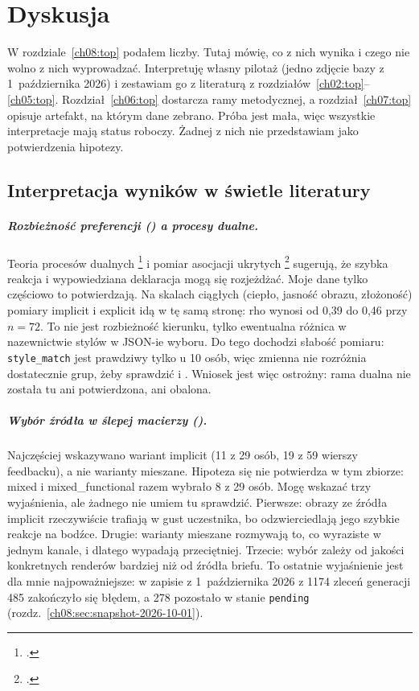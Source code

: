 \chapter{Dyskusja}
\label{ch09:top}

W rozdziale~\ref{ch08:top} podałem liczby. Tutaj mówię, co z nich wynika i czego nie wolno z nich wyprowadzać. Interpretuję własny pilotaż (jedno zdjęcie bazy z 1~października 2026) i zestawiam go z literaturą z rozdziałów~\ref{ch02:top}--\ref{ch05:top}. Rozdział~\ref{ch06:top} dostarcza ramy metodycznej, a rozdział~\ref{ch07:top} opisuje artefakt, na którym dane zebrano.
Próba jest mała, więc wszystkie interpretacje mają status roboczy. Żadnej z nich nie przedstawiam jako potwierdzenia hipotezy.

\section{Interpretacja wyników w świetle literatury}
\label{ch09:sec:interpretacja}

\paragraph{Rozbieżność preferencji () a procesy dualne.}
Teoria procesów dualnych \footcite{kahneman2011thinking} i pomiar asocjacji ukrytych \footcite{greenwald1998iat} sugerują, że szybka reakcja i wypowiedziana deklaracja mogą się rozjeżdżać. Moje dane tylko częściowo to potwierdzają.
Na skalach ciągłych (ciepło, jasność obrazu, złożoność) pomiary implicit i explicit idą w tę samą stronę: rho wynosi od 0,39 do 0,46 przy $n=72$. To nie jest rozbieżność kierunku, tylko ewentualna różnica w nazewnictwie stylów w JSON-ie wyboru.
Do tego dochodzi słabość pomiaru: \texttt{style\_match} jest prawdziwy tylko u 10 osób, więc zmienna nie rozróżnia dostatecznie grup, żeby sprawdzić  i . Wniosek jest więc ostrożny: rama dualna nie została tu ani potwierdzona, ani obalona.

\paragraph{Wybór źródła w ślepej macierzy ().}
Najczęściej wskazywano wariant implicit (11 z 29 osób, 19 z 59 wierszy feedbacku), a nie warianty mieszane. Hipoteza  się nie potwierdza w tym zbiorze: mixed i mixed\_functional razem wybrało 8 z 29 osób.
Mogę wskazać trzy wyjaśnienia, ale żadnego nie umiem tu sprawdzić. Pierwsze: obrazy ze źródła implicit rzeczywiście trafiają w gust uczestnika, bo odzwierciedlają jego szybkie reakcje na bodźce. Drugie: warianty mieszane rozmywają to, co wyraziste w jednym kanale, i dlatego wypadają przeciętniej. Trzecie: wybór zależy od jakości konkretnych renderów bardziej niż od źródła briefu. To ostatnie wyjaśnienie jest dla mnie najpoważniejsze: w zapisie z 1~października 2026 z 1174 zleceń generacji 485 zakończyło się błędem, a 278 pozostało w stanie \texttt{pending} (rozdz.~\ref{ch08:sec:snapshot-2026-10-01}).
